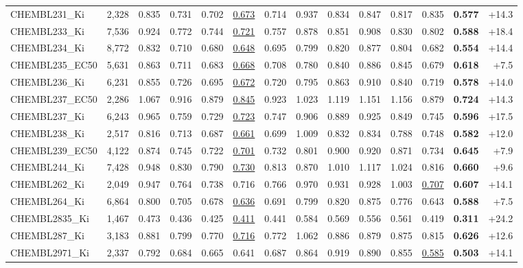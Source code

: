 \begin{table}[t]
{\begin{tabular}{lrrrrrrrrrrrrr}
CHEMBL231\_Ki & 2,328 & 0.835 & 0.731 & 0.702 & \underline{0.673} & 0.714 & 0.937 & 0.834 & 0.847 & 0.817 & 0.835 & \textbf{0.577} & +14.3\\
CHEMBL233\_Ki & 7,536 & 0.924 & 0.772 & 0.744 & \underline{0.721} & 0.757 & 0.878 & 0.851 & 0.908 & 0.830 & 0.802 & \textbf{0.588} & +18.4\\
CHEMBL234\_Ki & 8,772 & 0.832 & 0.710 & 0.680 & \underline{0.648} & 0.695 & 0.799 & 0.820 & 0.877 & 0.804 & 0.682 & \textbf{0.554} & +14.4\\
CHEMBL235\_EC50 & 5,631 & 0.863 & 0.711 & 0.683 & \underline{0.668} & 0.708 & 0.780 & 0.840 & 0.886 & 0.845 & 0.679 & \textbf{0.618} & +7.5\\
CHEMBL236\_Ki & 6,231 & 0.855 & 0.726 & 0.695 & \underline{0.672} & 0.720 & 0.795 & 0.863 & 0.910 & 0.840 & 0.719 & \textbf{0.578} & +14.0\\
CHEMBL237\_EC50 & 2,286 & 1.067 & 0.916 & 0.879 & \underline{0.845} & 0.923 & 1.023 & 1.119 & 1.151 & 1.156 & 0.879 & \textbf{0.724} & +14.3\\
CHEMBL237\_Ki & 6,243 & 0.965 & 0.759 & 0.729 & \underline{0.723} & 0.747 & 0.906 & 0.889 & 0.925 & 0.849 & 0.745 & \textbf{0.596} & +17.5\\
CHEMBL238\_Ki & 2,517 & 0.816 & 0.713 & 0.687 & \underline{0.661} & 0.699 & 1.009 & 0.832 & 0.834 & 0.788 & 0.748 & \textbf{0.582} & +12.0\\
CHEMBL239\_EC50 & 4,122 & 0.874 & 0.745 & 0.722 & \underline{0.701} & 0.732 & 0.801 & 0.900 & 0.920 & 0.871 & 0.734 & \textbf{0.645} & +7.9\\
CHEMBL244\_Ki & 7,428 & 0.948 & 0.830 & 0.790 & \underline{0.730} & 0.813 & 0.870 & 1.010 & 1.117 & 1.024 & 0.816 & \textbf{0.660} & +9.6\\
CHEMBL262\_Ki & 2,049 & 0.947 & 0.764 & 0.738 & 0.716 & 0.766 & 0.970 & 0.931 & 0.928 & 1.003 & \underline{0.707} & \textbf{0.607} & +14.1\\
CHEMBL264\_Ki & 6,864 & 0.800 & 0.705 & 0.678 & \underline{0.636} & 0.691 & 0.799 & 0.820 & 0.875 & 0.776 & 0.643 & \textbf{0.588} & +7.5\\
CHEMBL2835\_Ki & 1,467 & 0.473 & 0.436 & 0.425 & \underline{0.411} & 0.441 & 0.584 & 0.569 & 0.556 & 0.561 & 0.419 & \textbf{0.311} & +24.2\\
CHEMBL287\_Ki & 3,183 & 0.881 & 0.799 & 0.770 & \underline{0.716} & 0.772 & 1.062 & 0.886 & 0.879 & 0.875 & 0.815 & \textbf{0.626} & +12.6\\
CHEMBL2971\_Ki & 2,337 & 0.792 & 0.684 & 0.665 & 0.641 & 0.687 & 0.864 & 0.919 & 0.890 & 0.855 & \underline{0.585} & \textbf{0.503} & +14.1\\

\end{tabular}}
\end{table}
